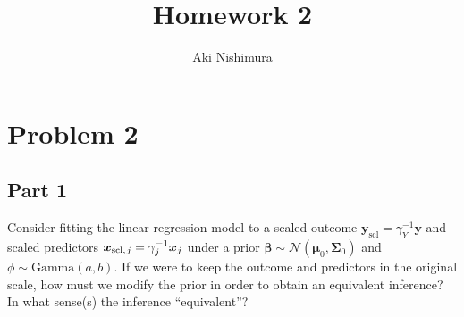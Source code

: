 \documentclass[letterpaper, 12pt]{article}
\title{Homework 2}
\author{Aki Nishimura}
\date{}
\theoremstyle{plain}
\newcommand{\thinnerspace}{\mskip.5\thinmuskip}
\newcommand{\normalDist}{\mathcal{N}}
\newcommand{\gammaDist}{\mathrm{Gamma}}
\newcommand{\by}{\bm{y}}
\newcommand{\bx}{\bm{x}}
\newcommand{\bmu}{\bm{\mu}}
\newcommand{\bbeta}{\bm{\beta}}
\newcommand{\bSigma}{\bm{\Sigma}}
\begin{document}
	
\maketitle

\section{Problem 2}

\subsection*{Part 1}
Consider fitting the linear regression model to a scaled outcome $\by_{\textrm{scl}} = \gamma_Y^{-1} \by$ and scaled predictors $\bx_{\mathrm{scl}, \thinnerspace j} = \gamma_j^{-1} \bx_j$ under a prior $\bbeta \sim \normalDist(\bmu_0, \bSigma_0)$ and $\phi \sim \gammaDist(a, b)$. 
If we were to keep the outcome and predictors in the original scale, how must we modify the prior in order to obtain an equivalent inference?
In what sense(s) the inference ``equivalent''?
	
\end{document}
